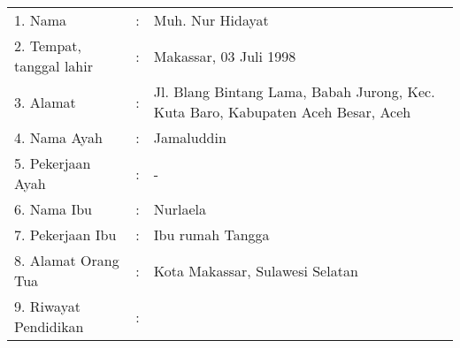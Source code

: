 \begin{spacing}{1.5}
	\thispagestyle{empty}
	\begin{flushleft}
		\begin{tabular}{lp{0.25cm}p{9cm}}
			1. Nama &:& Muh. Nur Hidayat\\
			2. Tempat, tanggal lahir &:& Makassar, 03 Juli 1998\\
			3. Alamat &:& Jl. Blang Bintang Lama, Babah Jurong, Kec. Kuta Baro, Kabupaten Aceh Besar, Aceh \\
			4. Nama Ayah &:& Jamaluddin\\
			5. Pekerjaan Ayah &:& -\\
			6. Nama Ibu &:& Nurlaela\\
			7. Pekerjaan Ibu &:& Ibu rumah Tangga\\	
			8. Alamat Orang Tua &:& Kota Makassar, Sulawesi Selatan\\
			9. Riwayat Pendidikan &:& \\
		\end{tabular}
	\end{flushleft}
	

\end{spacing}
